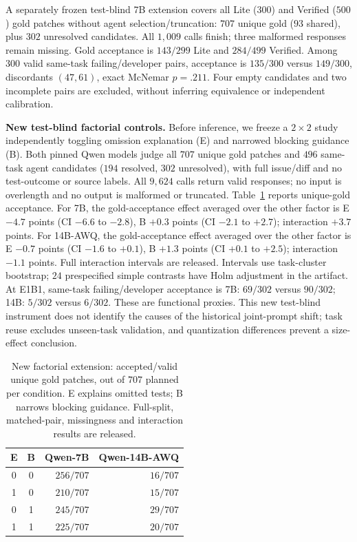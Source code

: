 \documentclass[10pt,conference]{IEEEtran}
\begin{document}
A separately frozen test-blind 7B extension covers all Lite ($300$) and Verified ($500$)
gold patches without agent selection/truncation: $707$ unique gold ($93$ shared), plus
$302$ unresolved candidates. All $1,009$ calls finish; three malformed responses remain
missing. Gold acceptance is $143/299$ Lite and $284/499$ Verified. Among $300$ valid
same-task failing/developer pairs, acceptance is $135/300$ versus $149/300$,
discordants $(47,61)$, exact McNemar $p=.211$. Four empty candidates and two incomplete
pairs are excluded, without inferring equivalence or independent calibration.


\textbf{New test-blind factorial controls.} Before inference, we freeze a $2\times2$
study independently toggling omission explanation (E) and narrowed blocking guidance (B).
Both pinned Qwen models judge all $707$ unique gold patches and $496$ same-task agent
candidates ($194$ resolved, $302$ unresolved), with full issue/diff and no test-outcome
or source labels. All $9,624$ calls return valid responses; no input is overlength and no output is malformed or truncated.
Table~\ref{tab:factorial} reports unique-gold acceptance. For 7B, the gold-acceptance effect averaged over the other factor is E $-4.7$ points (CI $-6.6$ to $-2.8$), B $+0.3$ points (CI $-2.1$ to $+2.7$); interaction $+3.7$ points. For 14B-AWQ, the gold-acceptance effect averaged over the other factor is E $-0.7$ points (CI $-1.6$ to $+0.1$), B $+1.3$ points (CI $+0.1$ to $+2.5$); interaction $-1.1$ points.
Full interaction intervals are released. Intervals use task-cluster bootstrap; $24$ prespecified simple contrasts have Holm
adjustment in the artifact. At E1B1, same-task failing/developer acceptance is
7B: $69/302$ versus $90/302$; 14B: $5/302$ versus $6/302$. These are functional proxies. This new test-blind instrument
does not identify the causes of the historical joint-prompt shift; task reuse excludes
unseen-task validation, and quantization differences prevent a size-effect conclusion.

\begin{table}[t]
\centering
\caption{New factorial extension: accepted/valid unique gold patches, out of $707$
planned per condition. E explains omitted tests; B narrows blocking guidance. Full-split,
matched-pair, missingness and interaction results are released.}
\label{tab:factorial}
\footnotesize
\begin{tabular}{ccrr}
\toprule
E & B & Qwen-7B & Qwen-14B-AWQ \\
\midrule
0 & 0 & $256/707$ & $16/707$ \\
1 & 0 & $210/707$ & $15/707$ \\
0 & 1 & $245/707$ & $29/707$ \\
1 & 1 & $225/707$ & $20/707$ \\
\bottomrule
\end{tabular}
\end{table}
\end{document}
